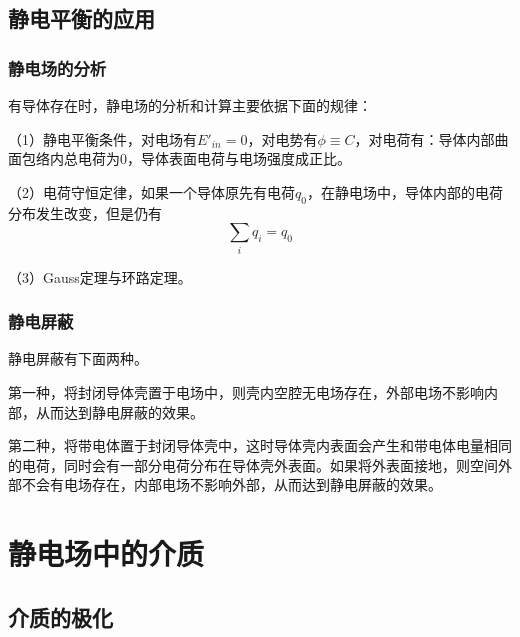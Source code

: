 \documentclass[UTF8,openany]{book}
\begin{document}
	\section{静电平衡的应用}
	\subsection{静电场的分析}
	\par 有导体存在时，静电场的分析和计算主要依据下面的规律：
	\par （1）静电平衡条件，对电场有$E'_{in}=0$，对电势有$\phi\equiv C$，对电荷有：导体内部曲面包络内总电荷为0，导体表面电荷与电场强度成正比。
	\par （2）电荷守恒定律，如果一个导体原先有电荷$q_0$，在静电场中，导体内部的电荷分布发生改变，但是仍有
	$$\sum_{i}q_i=q_0$$
	\par （3）Gauss定理与环路定理。
	\subsection{静电屏蔽}
	\par 静电屏蔽有下面两种。
	\par 第一种，将封闭导体壳置于电场中，则壳内空腔无电场存在，外部电场不影响内部，从而达到静电屏蔽的效果。
	\par 第二种，将带电体置于封闭导体壳中，这时导体壳内表面会产生和带电体电量相同的电荷，同时会有一部分电荷分布在导体壳外表面。如果将外表面接地，则空间外部不会有电场存在，内部电场不影响外部，从而达到静电屏蔽的效果。
	
	\chapter{静电场中的介质}
	\section{介质的极化}
\end{document}
